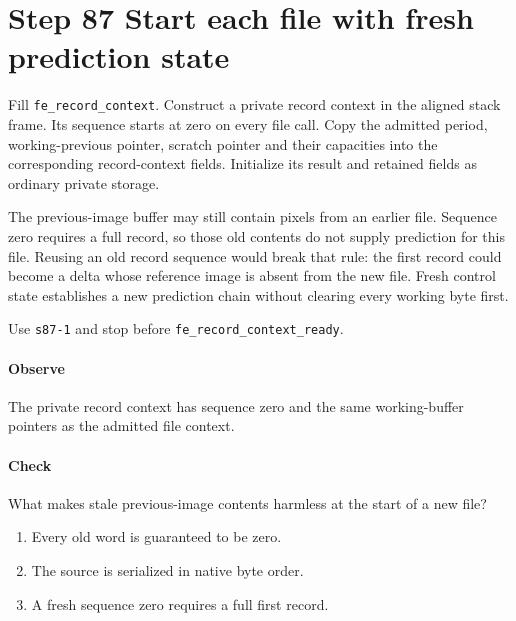 \section{Step 87 Start each file with fresh prediction state}
Fill \texttt{fe\_record\_context}. Construct a private record context in the aligned stack frame. Its sequence starts at zero on every file call. Copy the admitted period, working-previous pointer, scratch pointer and their capacities into the corresponding record-context fields. Initialize its result and retained fields as ordinary private storage.

The previous-image buffer may still contain pixels from an earlier file. Sequence zero requires a full record, so those old contents do not supply prediction for this file. Reusing an old record sequence would break that rule: the first record could become a delta whose reference image is absent from the new file. Fresh control state establishes a new prediction chain without clearing every working byte first.

Use \texttt{s87-1} and stop before \texttt{fe\_record\_context\_ready}.

\paragraph{Observe} The private record context has sequence zero and the same working-buffer pointers as the admitted file context.

\paragraph{Check} What makes stale previous-image contents harmless at the start of a new file?
\begin{enumerate}[label=\Alph*.]
  \item Every old word is guaranteed to be zero.
  \item The source is serialized in native byte order.
  \item A fresh sequence zero requires a full first record.
\end{enumerate}
